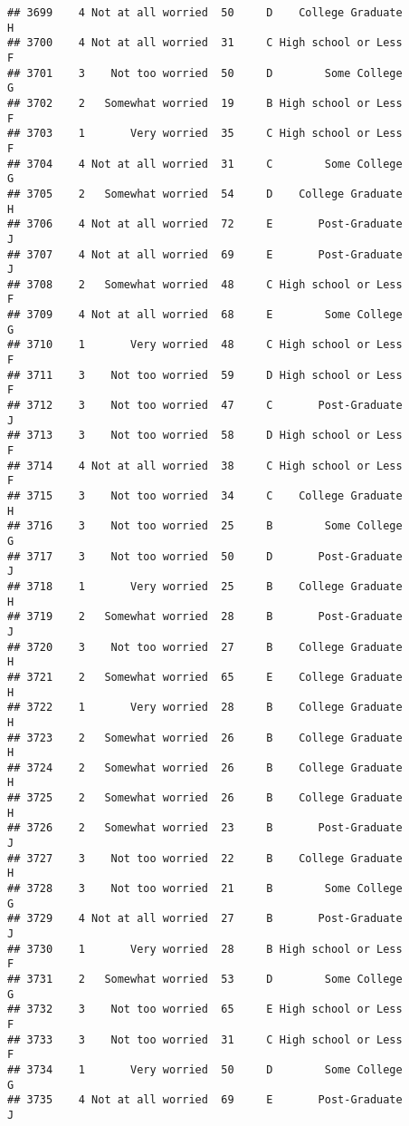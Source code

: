 \documentclass[
]{article}
\begin{document}
\begin{verbatim}
## 3699    4 Not at all worried  50     D    College Graduate         H
## 3700    4 Not at all worried  31     C High school or Less         F
## 3701    3    Not too worried  50     D        Some College         G
## 3702    2   Somewhat worried  19     B High school or Less         F
## 3703    1       Very worried  35     C High school or Less         F
## 3704    4 Not at all worried  31     C        Some College         G
## 3705    2   Somewhat worried  54     D    College Graduate         H
## 3706    4 Not at all worried  72     E       Post-Graduate         J
## 3707    4 Not at all worried  69     E       Post-Graduate         J
## 3708    2   Somewhat worried  48     C High school or Less         F
## 3709    4 Not at all worried  68     E        Some College         G
## 3710    1       Very worried  48     C High school or Less         F
## 3711    3    Not too worried  59     D High school or Less         F
## 3712    3    Not too worried  47     C       Post-Graduate         J
## 3713    3    Not too worried  58     D High school or Less         F
## 3714    4 Not at all worried  38     C High school or Less         F
## 3715    3    Not too worried  34     C    College Graduate         H
## 3716    3    Not too worried  25     B        Some College         G
## 3717    3    Not too worried  50     D       Post-Graduate         J
## 3718    1       Very worried  25     B    College Graduate         H
## 3719    2   Somewhat worried  28     B       Post-Graduate         J
## 3720    3    Not too worried  27     B    College Graduate         H
## 3721    2   Somewhat worried  65     E    College Graduate         H
## 3722    1       Very worried  28     B    College Graduate         H
## 3723    2   Somewhat worried  26     B    College Graduate         H
## 3724    2   Somewhat worried  26     B    College Graduate         H
## 3725    2   Somewhat worried  26     B    College Graduate         H
## 3726    2   Somewhat worried  23     B       Post-Graduate         J
## 3727    3    Not too worried  22     B    College Graduate         H
## 3728    3    Not too worried  21     B        Some College         G
## 3729    4 Not at all worried  27     B       Post-Graduate         J
## 3730    1       Very worried  28     B High school or Less         F
## 3731    2   Somewhat worried  53     D        Some College         G
## 3732    3    Not too worried  65     E High school or Less         F
## 3733    3    Not too worried  31     C High school or Less         F
## 3734    1       Very worried  50     D        Some College         G
## 3735    4 Not at all worried  69     E       Post-Graduate         J

\end{verbatim}
\end{document}
